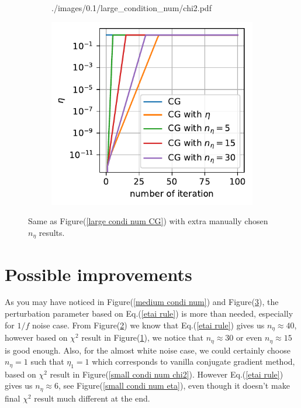 \documentclass[11pt, letterpaper]{article}
\begin{document}
\begin{figure}[htb]
\begin{subfigure}{0.33\textwidth}
        {./images/0.1/large_condition_num/chi2.pdf}
    \caption{}
    \label{large condi num chi2}
\end{subfigure}%
\begin{subfigure}{0.33\textwidth}
    \centering
    \includegraphics[width=\linewidth]
        {./images/0.1/large_condition_num/eta.pdf}
    \caption{}
    \label{large condi num eta}
\end{subfigure}
\caption{Same as Figure(\ref{large condi num CG}) with extra manually chosen 
    $n_{\eta}$ results.
}
\label{large condi num}
\end{figure}

\section{Possible improvements}
As you may have noticed in Figure(\ref{medium condi num})
and Figure(\ref{large condi num}), the perturbation parameter based on
Eq.(\ref{etai rule}) is more than needed, especially for $1/f$ noise case.
From Figure(\ref{large condi num eta}) we know that Eq.(\ref{etai rule}) gives
us $n_{\eta}\approx40$, however based on $\chi^2$ result in 
Figure(\ref{large condi num chi2}), we notice that $n_{\eta}\approx30$ or 
even $n_{\eta} \approx 15$ is good enough.
Also, for the almost white noise case, we could certainly choose $n_{\eta}=1$
such that $\eta_1=1$ which corresponds to vanilla conjugate gradient method,
based on $\chi^2$ result in Figure(\ref{small condi num chi2}).
However Eq.(\ref{etai rule}) gives us $n_{\eta} \approx 6$,
see Figure(\ref{small condi num eta}), even though it doesn't make final 
$\chi^2$ result much different at the end.
\end{document}
